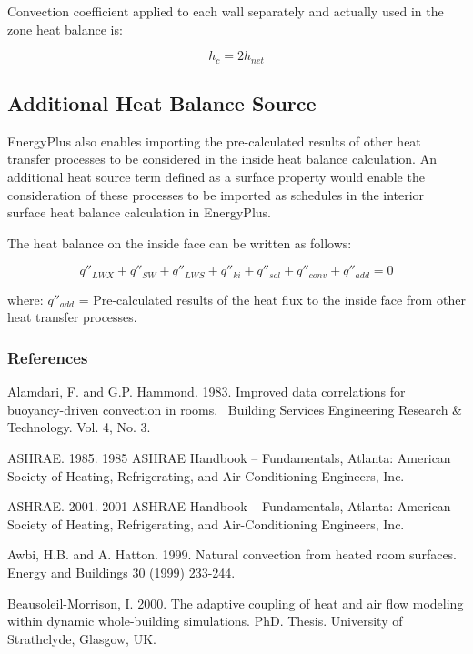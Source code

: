 Convection coefficient applied to each wall separately and actually used in the zone heat balance is:

\begin{equation}
{h_c} = 2{h_{net}}
\end{equation}

\subsection{Additional Heat Balance Source}\label{additional-heat-balance-source}

EnergyPlus also enables importing the pre-calculated results of other heat transfer processes to be considered in the inside heat balance calculation. An additional heat source term defined as a surface property would enable the consideration of these processes to be imported as schedules in the interior surface heat balance calculation in EnergyPlus.

The heat balance on the inside face can be written as follows:

\begin{equation}
{q''_{LWX}} + {q''_{SW}} + {q''_{LWS}} + {q''_{ki}} + {q''_{sol}} + {q''_{conv}} + {q''_{add}} = 0
\end{equation}

where:
\(q''_{add}\) = Pre-calculated results of the heat flux to the inside face from other heat transfer processes.

\subsubsection{References}\label{references-032}

Alamdari, F. and G.P. Hammond. 1983. Improved data correlations for buoyancy-driven convection in rooms.~ Building Services Engineering Research \& Technology. Vol. 4, No. 3.

ASHRAE. 1985. 1985 ASHRAE Handbook -- Fundamentals, Atlanta: American Society of Heating, Refrigerating, and Air-Conditioning Engineers, Inc.

ASHRAE. 2001. 2001 ASHRAE Handbook -- Fundamentals, Atlanta: American Society of Heating, Refrigerating, and Air-Conditioning Engineers, Inc.

Awbi, H.B. and A. Hatton. 1999. Natural convection from heated room surfaces. Energy and Buildings 30 (1999) 233-244.

Beausoleil-Morrison, I. 2000. The adaptive coupling of heat and air flow modeling within dynamic whole-building simulations. PhD. Thesis. University of Strathclyde, Glasgow, UK.


